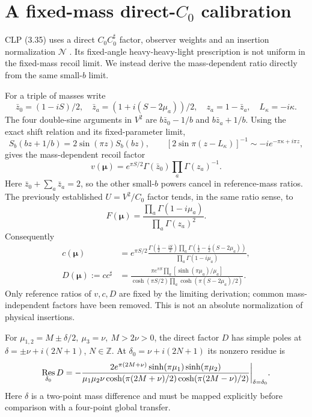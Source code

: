 \documentclass[11pt,a4paper]{article}
\begin{document}
\section{A fixed-mass direct-\(C_0\) calibration}
CLP (3.35) uses a direct \(C_0 C_0^\sharp\) factor, observer
weights and an insertion normalization \(\mathcal N\) \cite{clp}.
Its fixed-angle heavy-heavy-light prescription is not uniform
in the fixed-mass recoil limit. We instead derive the
mass-dependent ratio directly from the same small-\(b\) limit.

For a triple of masses write
\[
\bar z_0=(1-iS)/2,\quad
\bar z_a=(1+i(S-2\mu_a))/2,\quad z_a=1-\bar z_a,\quad L_\kappa=-i\kappa .
\]
The four double-sine arguments in \(V^2\) are
\(b\bar z_0-1/b\) and \(b\bar z_a+1/b\).
Using the exact shift relation and its fixed-parameter limit,
\[
S_b(bz+1/b)=2\sin(\pi z)S_b(bz),\qquad
[2\sin\pi(z-L_\kappa)]^{-1}\sim-i e^{-\pi\kappa+i\pi z},
\]
gives the mass-dependent recoil factor
\begin{equation}
v(\boldsymbol\mu)=
e^{\pi S/2}\Gamma(\bar z_0)\prod_a\Gamma(z_a)^{-1}.
\end{equation}
Here \(\bar z_0+\sum_a\bar z_a=2\), so the other small-\(b\)
powers cancel in reference-mass ratios.
The previously established \(U=V^2/C_0\) factor tends, in the
same ratio sense, to
\[
F(\boldsymbol\mu)=
\frac{\prod_a\Gamma(1-i\mu_a)}{\prod_a\Gamma(z_a)^2}.
\]
Consequently
\begin{align}
c(\boldsymbol\mu)&=
e^{\pi S/2}
\frac{\Gamma(\tfrac12-\tfrac{iS}{2})
 \prod_a\Gamma(\tfrac12-\tfrac i2(S-2\mu_a))}
{\prod_a\Gamma(1-i\mu_a)},\label{eq:c}\\
D(\boldsymbol\mu):=c c^\sharp&=
\frac{\pi e^{\pi S}\prod_a[\sinh(\pi\mu_a)/\mu_a]}
{\cosh(\pi S/2)\prod_a\cosh(\pi(S-2\mu_a)/2)}.\label{eq:d}
\end{align}
Only reference ratios of \(v,c,D\) are fixed by the limiting
derivation; common mass-independent factors have been removed.
This is not an absolute normalization of physical insertions.

For \(\mu_{1,2}=M\pm\delta/2,\ \mu_3=\nu,\ M>2\nu>0\),
the direct factor \(D\) has simple poles at
\(\delta=\pm\nu+i(2N+1)\), \(N\in\mathbb Z\).
At \(\delta_0=\nu+i(2N+1)\) its nonzero residue is
\begin{equation}
\mathop{\rm Res}_{\delta_0}D
=-\frac{2e^{\pi(2M+\nu)}
 \sinh(\pi\mu_1)\sinh(\pi\mu_2)}
{\mu_1\mu_2\nu\cosh(\pi(2M+\nu)/2)\cosh(\pi(2M-\nu)/2)}
\bigg|_{\delta=\delta_0}.
\label{eq:cres}
\end{equation}
Here \(\delta\) is a two-point mass difference and must be mapped
explicitly before comparison with a four-point global transfer.
\end{document}
